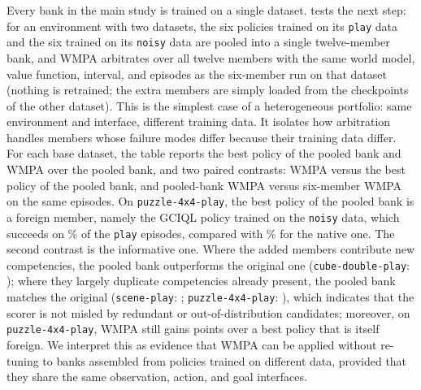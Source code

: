 \documentclass{article}
\theoremstyle{plain}
\theoremstyle{definition}
\theoremstyle{plain}
\newcommand{\wmpa}{\textsc{WMPA}}
\begin{document}
Every bank in the main study is trained on a single dataset.  tests the next step: for an environment with two datasets, the six policies trained on its \texttt{play} data and the six trained on its \texttt{noisy} data are pooled into a single twelve-member bank, and \wmpa{} arbitrates over all twelve members with the same world model, value function, interval, and episodes as the six-member run on that dataset (nothing is retrained; the extra members are simply loaded from the checkpoints of the other dataset). This is the simplest case of a heterogeneous portfolio: same environment and interface, different training data. It isolates how arbitration handles members whose failure modes differ because their training data differ. For each base dataset, the table reports the best policy of the pooled bank and \wmpa{} over the pooled bank, and two paired contrasts: \wmpa{} versus the best policy of the pooled bank, and pooled-bank \wmpa{} versus six-member \wmpa{} on the same episodes. On \texttt{puzzle-4x4-play}, the best policy of the pooled bank is a foreign member, namely the GCIQL policy trained on the \texttt{noisy} data, which succeeds on \BankPooledBestPuzzleFourbyFourPlay\% of the \texttt{play} episodes, compared with \BankFullBestPuzzleFourbyFourPlay\% for the native one. The second contrast is the informative one. Where the added members contribute new competencies, the pooled bank outperforms the original one (\texttt{cube-double-play}: \BankDeltaFullPooledCubeDoublePlay); where they largely duplicate competencies already present, the pooled bank matches the original (\texttt{scene-play}: \BankDeltaFullPooledScenePlay; \texttt{puzzle-4x4-play}: \BankDeltaFullPooledPuzzleFourbyFourPlay), which indicates that the scorer is not misled by redundant or out-of-distribution candidates; moreover, on \texttt{puzzle-4x4-play}, \wmpa{} still gains \BankDeltaPooledPuzzleFourbyFourPlay{} points over a best policy that is itself foreign. We interpret this as evidence that \wmpa{} can be applied without re-tuning to banks assembled from policies trained on different data, provided that they share the same observation, action, and goal interfaces.

\begin{table}[htbp]
\caption{\textbf{Pooled play+noisy banks}: the six policies of the base dataset plus the six trained on its sibling dataset, arbitrated with the base dataset's world model, value, and interval on the base dataset's episodes. $P$: bank size; best policy of that bank and its success; \wmpa{} over that bank; paired contrasts of \wmpa{} against the bank's best policy and of pooled-bank \wmpa{} against the six-member \wmpa{} of the row above. Numbers within $95\%$ of the row maximum are in bold. (${}^{*}$: interval excludes zero).}
\label{tab:bank-composition}
\centering
\scriptsize
\resizebox{\linewidth}{!}{}
\end{table}
\end{document}
